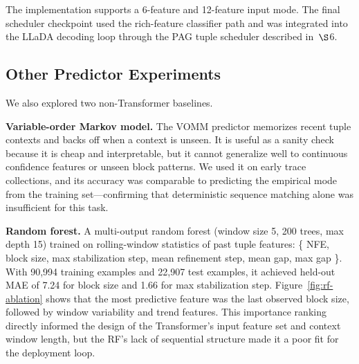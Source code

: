 \documentclass[11pt]{article}
\newcommand{\nfe}{NFE}
\begin{document}
The implementation supports a 6-feature and 12-feature input mode. The final scheduler checkpoint used the rich-feature classifier path and was integrated into the LLaDA decoding loop through the PAG tuple scheduler described in~$\S$6.

\subsection{Other Predictor Experiments}

We also explored two non-Transformer baselines.

\textbf{Variable-order Markov model.} The VOMM predictor memorizes recent tuple contexts and backs off when a context is unseen. It is useful as a sanity check because it is cheap and interpretable, but it cannot generalize well to continuous confidence features or unseen block patterns. We used it on early trace collections, and its accuracy was comparable to predicting the empirical mode from the training set---confirming that deterministic sequence matching alone was insufficient for this task.

\textbf{Random forest.} A multi-output random forest (window size 5, 200 trees, max depth 15) trained on rolling-window statistics of past tuple features: \{ \nfe{}, block size, max stabilization step, mean refinement step, mean gap, max gap \}. With 90{,}994 training examples and 22{,}907 test examples, it achieved held-out MAE of 7.24 for block size and 1.66 for max stabilization step. Figure~\ref{fig:rf-ablation} shows that the most predictive feature was the last observed block size, followed by window variability and trend features. This importance ranking directly informed the design of the Transformer's input feature set and context window length, but the RF's lack of sequential structure made it a poor fit for the deployment loop.
\end{document}
